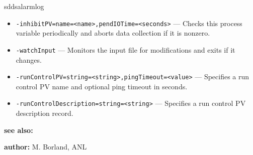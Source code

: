 \begin{sddsprog}{sddsalarmlog}
\begin{itemize}
  \item {\tt -inhibitPV=name=<name>,pendIOTime=<seconds>} --- Checks this process variable periodically and aborts data collection if it is nonzero.
  \item {\tt -watchInput} --- Monitors the input file for modifications and exits if it changes.
  \item {\tt -runControlPV=string=<string>,pingTimeout=<value>} --- Specifies a run control PV name and optional ping timeout in seconds.
  \item {\tt -runControlDescription=string=<string>} --- Specifies a run control PV description record.
\end{itemize}

\item \textbf{see also:}


\item \textbf{author:} M. Borland, ANL
\end{sddsprog}
